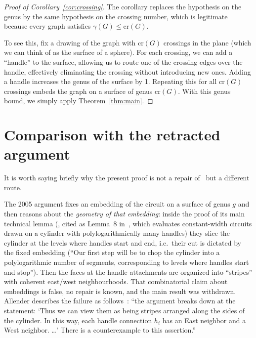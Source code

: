 \documentclass[11pt]{article}
\theoremstyle{definition}
\theoremstyle{remark}
\newcommand{\genus}{\gamma}
\begin{document}
\begin{proof}[Proof of Corollary~\ref{cor:crossing}]
The corollary replaces the hypothesis on the genus by the same hypothesis on the crossing number, which is legitimate because every graph satisfies $\genus(G)\le\mathrm{cr}(G)$.

To see this, fix a drawing of the graph with $\mathrm{cr}(G)$ crossings in the plane (which we can think of as the surface of a sphere). For each crossing, we can add a ``handle'' to the surface, allowing us to route one of the crossing edges over the handle, effectively eliminating the crossing without introducing new ones. Adding a handle increases the genus of the surface by 1. Repeating this for all $\mathrm{cr}(G)$ crossings embeds the graph on a surface of genus $\mathrm{cr}(G)$. With this genus bound, we simply apply Theorem~\ref{thm:main}.
\end{proof}

\section{Comparison with the retracted argument}\label{sec:adr}

It is worth saying briefly why the present proof is not a repair of~\cite{ADR05}
but a different route.

The 2005 argument fixes an embedding of the circuit on a surface of genus $g$ and
then reasons about the \emph{geometry of that embedding}: inside the proof of its
main technical lemma (\cite[Lemma~7]{ADR05}, cited as Lemma~8 in~\cite{Allender23},
which evaluates constant-width circuits drawn on a cylinder with polylogarithmically
many handles) they slice the cylinder at the levels where handles start and end, i.e.\
their cut is dictated by the fixed embedding (``Our first step will be to chop the
cylinder into a polylogarithmic number of segments, corresponding to levels where handles
start and stop''). Then the faces at the handle attachments are organized into ``stripes''
with coherent east/west neighbourhoods. That combinatorial claim about embeddings is
false, no repair is known, and the main result was withdrawn. Allender describes the
failure as follows~\cite[pp.~4--5]{Allender23}: ``the argument breaks down at the statement:
`Thus we can view them as being stripes arranged along the sides of the cylinder. In this
way, each handle connection $h_i$ has an East neighbor and a West neighbor. \dots'
There is a counterexample to this assertion.''
\end{document}
